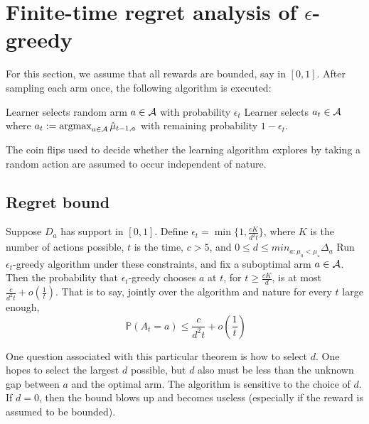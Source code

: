 \documentclass[11pt]{article}
\begin{document}
\section{Finite-time regret analysis of $\epsilon$-greedy}

For this section, we assume that all rewards are bounded, say in $[0,1]$.  After sampling each arm once, the following algorithm is executed:

\begin{algorithmic}[1]
\STATE Learner selects random arm $a \in \mathcal{A}$ with probability $\epsilon_{t}$
\STATE Learner selects $a_t \in \mathcal{A}$ where $a_t := \operatorname*{argmax}_{a \in \mathcal{A}} \hat{\mu}_{t-1, a}$ with remaining probability $1-\epsilon_{t}$.
\ENDFOR
\end{algorithmic}


The coin flips used to decide whether the learning algorithm explores by taking a random action are assumed to occur independent of nature.

\subsection{Regret bound}

\begin{theorem}
Suppose $D_a$ has support in $[0, 1]$.  Define $\epsilon_t = \min\{1, \frac{cK}{d^2t}\}$, where $K$ is the number of actions possible, $t$ is the time, $c > 5$, and $0 \le d \le min_{a:\mu_a < \mu_\star} \Delta_a$   Run $\epsilon_t$-greedy algorithm under these constraints, and fix a suboptimal arm $a \in \mathcal{A}$.  Then the probability that $\epsilon_t$-greedy chooses $a$ at $t$, for $t \ge \frac{cK}{d}$, is at most $\frac{c}{d^2t}+o(\frac{1}{t})$.  That is to say, jointly over the algorithm and nature for every $t$ large enough, 
\[
\ \mathbb{P}(A_t = a) \le \frac{c}{d^2t} + o(\frac{1}{t})
\]
\end{theorem}

One question associated with this particular theorem is how to select $d$.  One hopes to select the largest $d$ possible, but $d$ also must be less than the unknown gap between $a$ and the optimal arm.  
The algorithm is sensitive to the choice of $d$. If $d=0$, then the bound blows up and becomes useless (especially if the reward is assumed to be bounded).
\end{document}
